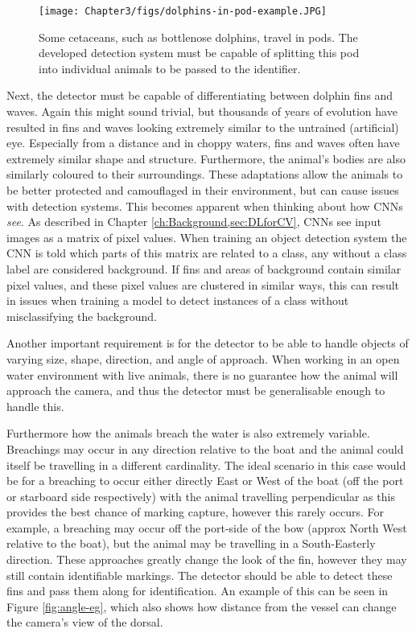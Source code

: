  \begin{figure}
 	\begin{center}
 		\texttt{[image: Chapter3/figs/dolphins-in-pod-example.JPG]}
 	\end{center}
 	\caption{Some cetaceans, such as bottlenose dolphins, travel in pods. The developed detection system must be capable of splitting this pod into individual animals to be passed to the identifier.
 	}
 	\label{fig:pod-eg}
 \end{figure}

 Next, the detector must be capable of differentiating between dolphin fins and waves. Again this might sound trivial, but thousands of years of evolution have resulted in fins and waves looking extremely similar to the untrained (artificial) eye. Especially from a distance and in choppy waters, fins and waves often have extremely similar shape and structure. Furthermore, the animal's bodies are also similarly coloured to their surroundings. These adaptations allow the animals to be better protected and camouflaged in their environment, but can cause issues with detection systems. This becomes apparent when thinking about how CNNs \textit{see}. As described in Chapter \ref{ch:Background,sec:DLforCV}, CNNs see input images as a matrix of pixel values. When training an object detection system the CNN is told which parts of this matrix are related to a class, any without a class label are considered background. If fins and areas of background contain similar pixel values, and these pixel values are clustered in similar ways, this can result in issues when training a model to detect instances of a class without misclassifying the background. 
 
 Another important requirement is for the detector to be able to handle objects of varying size, shape, direction, and angle of approach. When working in an open water environment with live animals, there is no guarantee how the animal will approach the camera, and thus the detector must be generalisable enough to handle this. 
 
 Furthermore how the animals breach the water is also extremely variable. Breachings may occur in any direction relative to the boat and the animal could itself be travelling in a different cardinality. The ideal scenario in this case would be for a breaching to occur either directly East or West of the boat (off the port or starboard side respectively) with the animal travelling perpendicular as this provides the best chance of marking capture, however this rarely occurs. For example, a breaching may occur off the port-side of the bow (approx North West relative to the boat), but the animal may be travelling in a South-Easterly direction. These approaches greatly change the look of the fin, however they may still contain identifiable markings. The detector should be able to detect these fins and pass them along for identification. An example of this can be seen in Figure \ref{fig:angle-eg}, which also shows how distance from the vessel can change the camera's view of the dorsal. 
 

